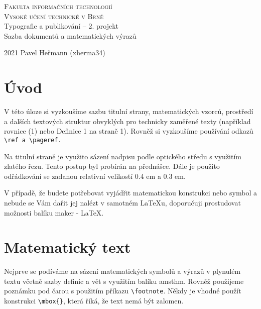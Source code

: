 \documentclass[a4paper, twocolumn, 11pt]{article}
\begin{document}
\begin{titlepage}

    \begin{center}
        \Huge
        \textsc{Fakulta informačních technologií\\ Vysoké učení technické v Brně}\\
        \LARGE{Typografie a publikování -- 2. projekt\\ Sazba dokumentů a matematických výrazů}
    \end{center}
    \LARGE{2021} 
    \hfill
    \LARGE{Pavel Heřmann (xherma34)}
\end{titlepage}

\section*{Úvod}
    V této úloze si vyzkoušíme sazbu titulní strany, matematických vzorců, prostředí a dalších
    textových struktur obvyklých pro technicky zaměřené texty (například rovnice (1)
    nebo Definice 1 na straně 1). Rovněž si vyzkoušíme používání odkazů \verb= \ref a \pageref.=
    
    \par
    
    Na titulní straně je využito sázení nadpisu podle optického středu s využitím zlatého řezu.
    Tento postup byl probírán na přednášce. Dále je použito odřádkování se zadanou relativní
    velikostí 0.4 em a 0.3 em.
    
    \par
  
    V případě, že budete potřebovat vyjádřit matematickou
    konstrukci nebo symbol a nebude se Vám dařit jej nalézt
    v samotném \LaTeX u, doporučuji prostudovat možnosti balíku maker \AmS - \LaTeX.
    
\section{Matematický text}

    Nejprve se podíváme na sázení matematických symbolů
    a výrazů v plynulém textu včetně sazby definic a vět s využitím balíku amsthm. Rovněž
    použijeme poznámku pod čarou s použitím příkazu \verb=\footnote=. Někdy je vhodné
    použít konstrukci \verb=\mbox{}=, která říká, že text nemá být
    zalomen.
\end{document}
